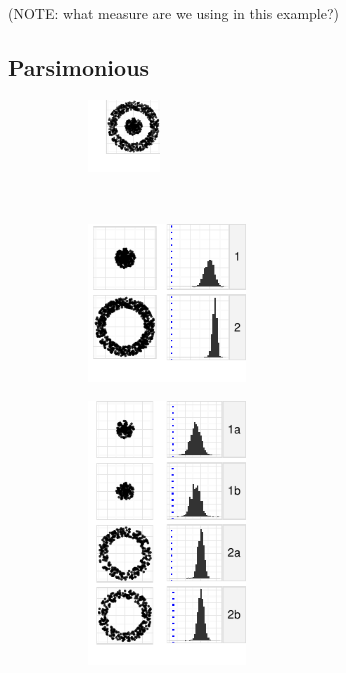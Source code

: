 (NOTE: what measure are we using in this example?)


\subsection{Parsimonious}
  \begin{figure}
    \centering
    \begin{minipage}[b]{1.7in}
       \begin{subfigure}[b]{\linewidth}
  	\includegraphics[width=0.75in]{images/donut1-donut2.pdf}
      \caption{}
      \label{fig:pars1}
      \end{subfigure}\\[\baselineskip]
      \begin{subfigure}[b]{\linewidth}
  	\includegraphics[width=1.65in]{images/19_5065416601259-cluster.pdf}
      \caption{}
      \label{fig:pars2}
      \end{subfigure}
      \begin{subfigure}[b]{\linewidth}
  	\includegraphics[width=1.65in]{images/9_27395081160431-cluster1.pdf}
        \caption{}
      \label{fig:pars3}        
      \end{subfigure}
    \end{minipage}

\end{figure}
